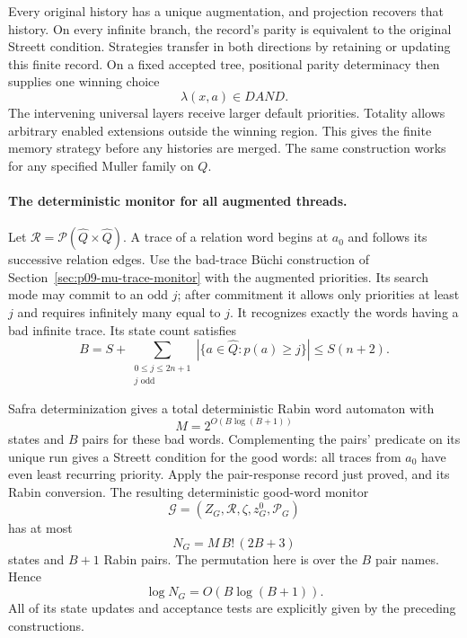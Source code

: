 Every original history
has a unique augmentation,
and projection recovers
that history.
On every infinite branch,
the record's parity
is equivalent to the
original Streett condition.
Strategies transfer in
both directions by retaining
or updating this finite
record.
On a fixed accepted
tree, positional parity
determinacy then supplies
one winning choice
\[
 \lambda(x,a)\in DAND.
\]
The intervening universal
layers receive larger
default priorities.
Totality allows arbitrary
enabled extensions outside
the winning region.
This gives the finite
memory strategy before
any histories are merged.
The same construction
works for any specified
Muller family on \(Q\).

\paragraph{The deterministic monitor for all augmented threads.}
Let
\(\mathcal R=\mathcal P(\widehat Q\times\widehat Q)\).
A trace of a relation
word begins at \(a_0\)
and follows its successive
relation edges.
Use the bad-trace
B\"uchi construction of
Section~\ref{sec:p09-mu-trace-monitor}
with the augmented priorities.
Its search mode may
commit to an odd \(j\);
after commitment it
allows only priorities
at least \(j\) and
requires infinitely many
equal to \(j\).
It recognizes exactly
the words having a
bad infinite trace.
Its state count satisfies
\[
 B=S+\sum_{\substack{0\leq j\leq2n+1\\j\text{ odd}}}
       |\{a\in\widehat Q:p(a)\geq j\}|
       \leq S(n+2).
\]

Safra determinization gives
a total deterministic
Rabin word automaton
with
\[
 M=2^{O(B\log(B+1))}
\]
states and \(B\)
pairs for these bad
words. Complementing
the pairs' predicate
on its unique run
gives a Streett condition
for the good words:
all traces from \(a_0\)
have even least
recurring priority.
Apply the pair-response
record just proved,
and its Rabin conversion.
The resulting deterministic
good-word monitor
\[
 \mathcal G=(Z_G,\mathcal R,\zeta,z_G^0,\mathcal P_G)
\]
has at most
\[
 N_G=M\,B!\,(2B+3)
\]
states and \(B+1\)
Rabin pairs.
The permutation here
is over the \(B\)
pair names. Hence
\[
 \log N_G=O(B\log(B+1)).
\]
All of its state
updates and acceptance
tests are explicitly
given by the preceding
constructions.

